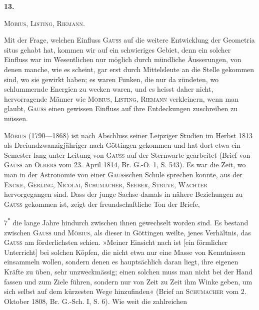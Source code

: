 \clearpage\begingroup{}
\renewcommand{\thefootnote}{\arabic{footnote})}\setcounter{footnote}{1}
\begin{center}
\textbf{13.}\par\smallskip
\textsc{Möbius, Listing, Riemann.}
\end{center}
\noindent\hspace*{\parindent}Mit der Frage, welchen Einfluss \textsc{Gauss} auf die weitere Entwicklung der
Geometria situs gehabt hat, kommen wir auf ein schwieriges Gebiet, denn
ein solcher Einfluss war im Wesentlichen nur möglich durch mündliche
Äusserungen, von denen manche, wie es scheint, gar erst durch Mittelsleute
an die Stelle gekommen sind, wo sie gewirkt haben; es waren Funken, die
nur da zündeten, wo schlummernde Energien zu wecken waren, und es heisst
daher nicht, hervorragende Männer wie \textsc{Möbius, Listing, Riemann} verkleinern,
wenn man glaubt, \textsc{Gauss} einen gewissen Einfluss auf ihre Entdeckungen zuschreiben
zu müssen.
\par\medskip
\textsc{Möbius} (1790—1868) ist nach Abschluss seiner Leipziger Studien im
Herbst 1813 als Dreiundzwanzigjähriger nach Göttingen gekommen und hat
dort etwa ein Semester lang unter Leitung von \textsc{Gauss} auf der Sternwarte gearbeitet
(Brief von \textsc{Gauss} an \textsc{Olbers} vom 23. April 1814, Br. G.-O. 1, S. 543).
Es war die Zeit, wo man in der Astronomie von einer \textsc{Gauss}schen Schule
sprechen konnte, aus der \textsc{Encke, Gerling, Nicolai, Schumacher, Seeber, Struve,
Wachter} hervorgegangen sind. Dass der junge Sachse damals in nähere Beziehungen
zu \textsc{Gauss} gekommen ist, zeigt der freundschaftliche Ton der Briefe,
\par\nobreak\hfill{\small 7\textsuperscript{*}}
\clearpage{}\setcounter{footnote}{0}
\noindent die lange Jahre hindurch zwischen ihnen gewechselt worden sind. Es bestand
zwischen \textsc{Gauss} und \textsc{Möbius}, als dieser in Göttingen weilte, jenes Verhältnis,
das \textsc{Gauss} am förderlichsten schien. »Meiner Einsicht nach ist [ein förmlicher
Unterricht] bei solchen Köpfen, die nicht etwa nur eine Masse von Kenntnissen
einsammeln wollen, sondern denen es hauptsächlich daran liegt, ihre
eigenen Kräfte zu üben, sehr unzweckmässig; einen solchen muss man nicht
bei der Hand fassen und zum Ziele führen, sondern nur von Zeit zu Zeit
ihm Winke geben, um sich selbst auf dem kürzesten Wege hinzufinden« (Brief
an \textsc{Schumacher} vom 2. Oktober 1808, Br. G.-Sch. I, S. 6). Wie weit die zahlreichen
